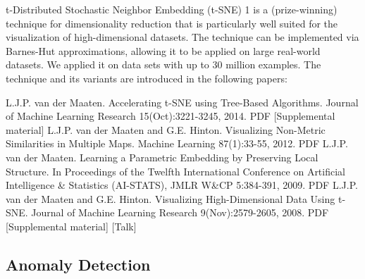 t-Distributed Stochastic Neighbor Embedding (t-SNE) 1 is a (prize-winning) technique for dimensionality reduction that is particularly well suited for the visualization of high-dimensional datasets. The technique can be implemented via Barnes-Hut approximations, allowing it to be applied on large real-world datasets. We applied it on data sets with up to 30 million examples. The technique and its variants are introduced in the following papers:

L.J.P. van der Maaten. Accelerating t-SNE using Tree-Based Algorithms. Journal of Machine Learning Research 15(Oct):3221-3245, 2014. PDF [Supplemental material]
L.J.P. van der Maaten and G.E. Hinton. Visualizing Non-Metric Similarities in Multiple Maps. Machine Learning 87(1):33-55, 2012. PDF
L.J.P. van der Maaten. Learning a Parametric Embedding by Preserving Local Structure. In Proceedings of the Twelfth International Conference on Artificial Intelligence & Statistics (AI-STATS), JMLR W&CP 5:384-391, 2009. PDF
L.J.P. van der Maaten and G.E. Hinton. Visualizing High-Dimensional Data Using t-SNE. Journal of Machine Learning Research 9(Nov):2579-2605, 2008. PDF [Supplemental material] [Talk]

\subsection{Anomaly Detection}


